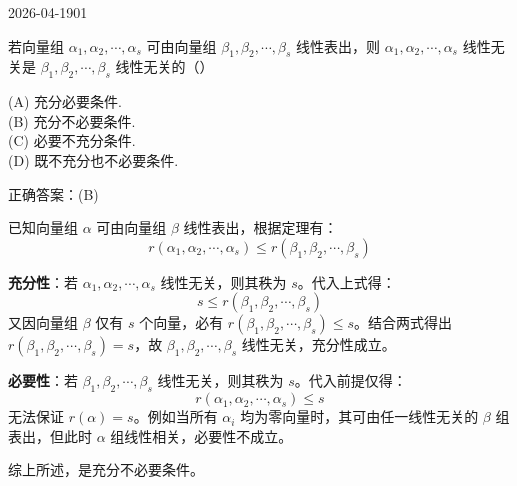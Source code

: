 \begin{mistake}{2026-04-19}{01}

\begin{problemcontent}
若向量组 \(\alpha_1, \alpha_2, \cdots, \alpha_s\) 可由向量组 \(\beta_1, \beta_2, \cdots, \beta_s\) 线性表出，则 \(\alpha_1, \alpha_2, \cdots, \alpha_s\) 线性无关是 \(\beta_1, \beta_2, \cdots, \beta_s\) 线性无关的（\quad ）

(A) 充分必要条件. \\
(B) 充分不必要条件. \\
(C) 必要不充分条件. \\
(D) 既不充分也不必要条件.
\end{problemcontent}

\begin{solutioncontent}
正确答案：(B)

已知向量组 \(\alpha\) 可由向量组 \(\beta\) 线性表出，根据定理有：
\[ r(\alpha_1, \alpha_2, \cdots, \alpha_s) \le r(\beta_1, \beta_2, \cdots, \beta_s) \]

\textbf{充分性}：若 \(\alpha_1, \alpha_2, \cdots, \alpha_s\) 线性无关，则其秩为 \(s\)。代入上式得：
\[ s \le r(\beta_1, \beta_2, \cdots, \beta_s) \]
又因向量组 \(\beta\) 仅有 \(s\) 个向量，必有 \(r(\beta_1, \beta_2, \cdots, \beta_s) \le s\)。结合两式得出 \(r(\beta_1, \beta_2, \cdots, \beta_s) = s\)，故 \(\beta_1, \beta_2, \cdots, \beta_s\) 线性无关，充分性成立。

\textbf{必要性}：若 \(\beta_1, \beta_2, \cdots, \beta_s\) 线性无关，则其秩为 \(s\)。代入前提仅得：
\[ r(\alpha_1, \alpha_2, \cdots, \alpha_s) \le s \]
无法保证 \(r(\alpha) = s\)。例如当所有 \(\alpha_i\) 均为零向量时，其可由任一线性无关的 \(\beta\) 组表出，但此时 \(\alpha\) 组线性相关，必要性不成立。

综上所述，是充分不必要条件。
\end{solutioncontent}


\end{mistake}
